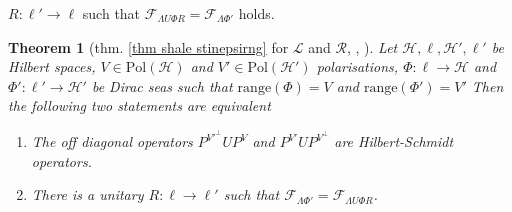 \documentclass[b5paper,draft,openbib,12pt]{memoir}
\newtheorem{Thm}[Def]{Theorem}
\begin{document}
\(R:\ell'\rightarrow \ell\) such that 
\(\mathcal{F}_{\mathsf{\Lambda}U\Phi R}
=\mathcal{F}_{\mathsf{\Lambda}\Phi' }\) holds. 
\begin{Thm}[{thm. \ref{thm shale stinepsirng} for \(\mathcal{L}\) and \(\mathcal{R}\), \cite[thm. 2.26]{ivp0}, \cite[thm 3.1]{deckert2016perspective} }]\label{thm: L R shale Stinespring}
Let \(\mathcal{H}, \ell, \mathcal{H}',\ell'\) be Hilbert spaces, 
\(V\in\mathrm{Pol}(\mathcal{H})\) and \(V'\in\mathrm{Pol}(\mathcal{H}')\) 
polarisations, \(\Phi:\ell\rightarrow  \mathcal{H}\) and 
\(\Phi':\ell'\rightarrow \mathcal{H}'\) be Dirac seas 
such that \(\mathrm{range}(\Phi)=V\) and \(\mathrm{range}(\Phi')=V'\)
Then the following two statements are equivalent
\begin{enumerate}[label=\alph*)]
  \item The off diagonal operators \(P^{{V'}^\perp}U P^V\) and 
  \(P^{V'}UP^{V^\perp}\) are Hilbert-Schmidt operators.
  \item There is a unitary \(R:\ell\rightarrow \ell'\) such 
  that \(\mathcal{F}_{\mathsf{\Lambda}\Phi'}=
  \mathcal{F}_{\mathsf{\Lambda}U\Phi R}\).
\end{enumerate}
\end{Thm}
\end{document}
